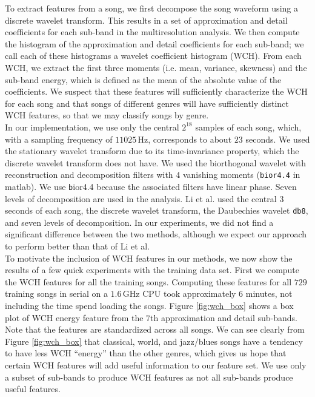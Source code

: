 \documentclass[12pt]{article}
\begin{document}
To extract features from a song, we first decompose the song waveform using a discrete wavelet transform.  This results in a set of approximation and detail coefficients for each sub-band in the multiresolution analysis.  We then compute the histogram of the approximation and detail coefficients for each sub-band; we call each of these histograms a wavelet coefficient histogram (WCH).  From each WCH, we extract the first three moments (i.e. mean, variance, skewness) and the sub-band energy, which is defined as the mean of the absolute value of the coefficients.  We suspect that these features will sufficiently characterize the WCH for each song and that songs of different genres will have sufficiently distinct WCH features, so that we may classify songs by genre.\\

In our implementation, we use only the central $2^{18}$ samples of each song, which, with a sampling frequency of $11025\,\text{Hz}$, corresponds to about $23$ seconds.  We used the stationary wavelet transform due to its time-invariance property, which the discrete wavelet transform does not have.  We used the biorthogonal wavelet with reconstruction and decomposition filters with $4$ vanishing moments (\texttt{bior4.4} in {\sc matlab}).  We use {\texttt bior4.4} because the associated filters have linear phase.  Seven levels of decomposition are used in the analysis.  Li et al. used the central $3$ seconds of each song, the discrete wavelet transform, the Daubechies wavelet \texttt{db8}, and seven levels of decomposition.  In our experiments, we did not find a significant difference between the two methods, although we expect our approach to perform better than that of Li et al.\\

To motivate the inclusion of WCH features in our methods, we now show the results of a few quick experiments with the training data set.  First we compute the WCH features for all the training songs.  Computing these features for all $729$ training songs in serial on a $1.6\,\text{GHz}$ CPU took approximately $6$ minutes, not including the time spend loading the songs.  Figure \ref{fig:wch_box} shows a box plot of WCH energy feature from the $7$th approximation and detail sub-bands.  Note that the features are standardized across all songs.  We can see clearly from Figure \ref{fig:wch_box} that classical, world, and jazz/blues songs have a tendency to have less WCH ``energy'' than the other genres, which gives us hope that certain WCH features will add useful information to our feature set.  We use only a subset of sub-bands to produce WCH features as not all sub-bands produce useful features.
\end{document}
